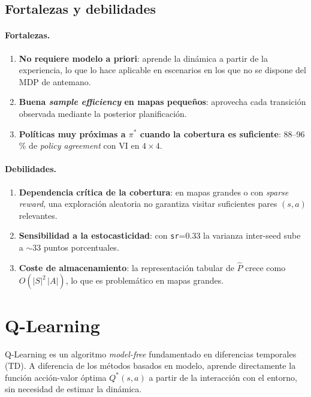 \documentclass[11pt,a4paper]{article}
\begin{document}
\subsection{Fortalezas y debilidades}

\paragraph{Fortalezas.}
\begin{enumerate}
  \item \textbf{No requiere modelo a priori}: aprende la dinámica a partir de la experiencia, lo que lo hace aplicable en escenarios en los que no se dispone del MDP de antemano.
  \item \textbf{Buena \emph{sample efficiency} en mapas pequeños}: aprovecha cada transición observada mediante la posterior planificación.
  \item \textbf{Políticas muy próximas a $\pi^{\ast}$ cuando la cobertura es suficiente}: 88--96\,\% de \emph{policy agreement} con VI en $4\times 4$.
\end{enumerate}

\paragraph{Debilidades.}
\begin{enumerate}
  \item \textbf{Dependencia crítica de la cobertura}: en mapas grandes o con \emph{sparse reward}, una exploración aleatoria no garantiza visitar suficientes pares $(s,a)$ relevantes.
  \item \textbf{Sensibilidad a la estocasticidad}: con \texttt{sr}=0.33 la varianza inter-seed sube a $\sim$33 puntos porcentuales.
  \item \textbf{Coste de almacenamiento}: la representación tabular de $\hat{P}$ crece como $O(|S|^2\,|A|)$, lo que es problemático en mapas grandes.
\end{enumerate}

\section{Q-Learning}

Q-Learning es un algoritmo \emph{model-free} fundamentado en diferencias temporales (TD). A diferencia de los métodos basados en modelo, aprende directamente la función acción-valor óptima $Q^{\ast}(s,a)$ a partir de la interacción con el entorno, sin necesidad de estimar la dinámica.
\end{document}
